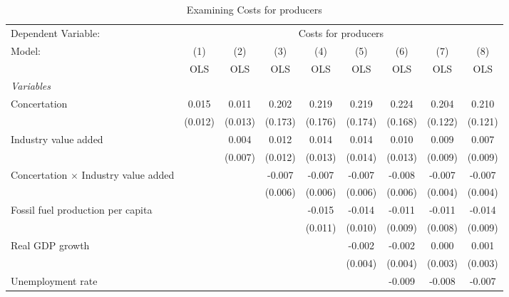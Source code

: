 
\begin{table}[htbp]
   \caption{Examining Costs for producers}
   \centering
   \begin{tabular}{lcccccccc}
      \toprule
      Dependent Variable: & \multicolumn{8}{c}{Costs for producers}\\
      Model:                                      & (1)     & (2)     & (3)     & (4)     & (5)     & (6)     & (7)     & (8)\\  
                                                  &  OLS    & OLS     & OLS     & OLS     & OLS     & OLS     & OLS     & OLS\\  
      \midrule
      \emph{Variables}\\
      Concertation                                & 0.015   & 0.011   & 0.202   & 0.219   & 0.219   & 0.224   & 0.204   & 0.210\\   
                                                  & (0.012) & (0.013) & (0.173) & (0.176) & (0.174) & (0.168) & (0.122) & (0.121)\\   
      Industry value added                        &         & 0.004   & 0.012   & 0.014   & 0.014   & 0.010   & 0.009   & 0.007\\   
                                                  &         & (0.007) & (0.012) & (0.013) & (0.014) & (0.013) & (0.009) & (0.009)\\   
      Concertation $\times$ Industry value added  &         &         & -0.007  & -0.007  & -0.007  & -0.008  & -0.007  & -0.007\\   
                                                  &         &         & (0.006) & (0.006) & (0.006) & (0.006) & (0.004) & (0.004)\\   
      Fossil fuel production per capita           &         &         &         & -0.015  & -0.014  & -0.011  & -0.011  & -0.014\\   
                                                  &         &         &         & (0.011) & (0.010) & (0.009) & (0.008) & (0.009)\\   
      Real GDP growth                             &         &         &         &         & -0.002  & -0.002  & 0.000   & 0.001\\   
                                                  &         &         &         &         & (0.004) & (0.004) & (0.003) & (0.003)\\   
      Unemployment rate                           &         &         &         &         &         & -0.009  & -0.008  & -0.007\\   

\end{tabular}
\end{table}
